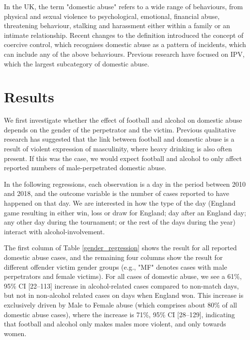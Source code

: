 \documentclass[12pt, letterpaper]{article}
\begin{document}
In the UK, the term "domestic abuse" refers to a wide range of behaviours, from physical and sexual violence to psychological, emotional, financial abuse, threatening behaviour, stalking and harassment either within a family or an intimate relationship\autocite{ONS}. Recent changes to the definition introduced the concept of coercive control, which recognises domestic abuse as a pattern of incidents, which can include any of the above behaviours. Previous research have focused on IPV, which the largest subcategory of domestic abuse. 

\section{Results}

We first investigate whether the effect of football and alcohol on domestic abuse depends on the gender of the perpetrator and the victim. Previous qualitative research has suggested that the link between football and domestic abuse is a result of violent expression of masculinity, where heavy drinking is also often present\autocite{Sabo}. If this was the case, we would expect football and alcohol to only affect reported numbers of male-perpetrated domestic abuse. 

In the following regressions, each observation is a day in the period between 2010 and 2018, and the outcome variable is the number of cases reported to have happened on that day. We are interested in how the type of the day (England game resulting in either win, loss or draw for England; day after an England day; any other day during the tournament; or the rest of the days during the year) interact with alcohol-involvement.

The first column of Table \ref{gender_regression} shows the result for all reported domestic abuse cases, and the remaining four columns show the result for different offender victim gender groups (e.g., "MF" denotes cases with male perpetrators and female victims). For all cases of domestic abuse, we see a 61\%, 95\% CI [22--113] increase in alcohol-related cases compared to non-match days, but not in non-alcohol related cases on days when England won. This increase is exclusively driven by Male to Female abuse (which comprises about 80\% of all domestic abuse cases), where the increase is 71\%, 95\% CI [28--129], indicating that football and alcohol only makes males more violent, and only towards women. 
\end{document}
